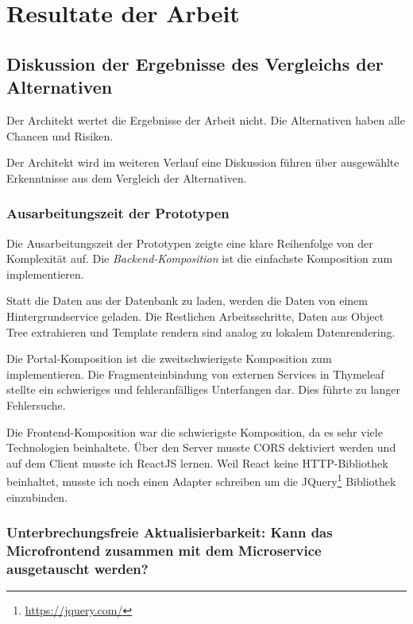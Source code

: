 
\chapter{Resultate der Arbeit}




\section{Diskussion der Ergebnisse des Vergleichs der Alternativen}
Der Architekt wertet die Ergebnisse der Arbeit nicht. Die Alternativen haben alle Chancen und Risiken.

Der Architekt wird im weiteren Verlauf eine Diskussion führen über ausgewählte Erkenntnisse aus dem Vergleich der Alternativen.

\subsection{Ausarbeitungszeit der Prototypen}
Die  Ausarbeitungszeit der Prototypen zeigte eine klare Reihenfolge  von der Komplexität auf. Die \textit{Backend-Komposition} ist die einfachste Komposition zum implementieren. 

Statt die Daten aus der Datenbank zu laden, werden die Daten von einem Hintergrundservice geladen. Die Restlichen Arbeitsschritte, Daten aus Object Tree extrahieren und Template rendern sind analog zu lokalem Datenrendering.

Die  Portal-Komposition ist die zweitschwierigste Komposition zum implementieren. Die Fragmenteinbindung von externen Services in Thymeleaf stellte ein schwieriges und fehleranfälliges Unterfangen dar. Dies führte zu langer Fehlersuche.

Die  Frontend-Komposition war die schwierigste Komposition, da es sehr viele Technologien beinhaltete. Über den Server musste CORS dektiviert werden und auf dem Client musste ich ReactJS lernen. Weil React keine HTTP-Bibliothek beinhaltet, musste ich noch einen Adapter \cite{Gamma1995} schreiben um die JQuery\footnote{\url{https://jquery.com/}} Bibliothek einzubinden. 

\subsection{Unterbrechungsfreie Aktualisierbarkeit: Kann das Microfrontend zusammen mit dem Microservice ausgetauscht werden?}\label{chap:results:main:Aktualisierbarkeit}

